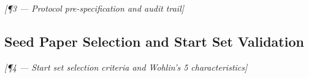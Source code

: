 \bigskip\noindent\textit{[¶3 — Protocol pre-specification and audit trail]}
%


\subsection{Seed Paper Selection and Start Set Validation}
\label{sec:methodology:seeds}



\bigskip\noindent\textit{[¶4 — Start set selection criteria and Wohlin's 5 characteristics]}


